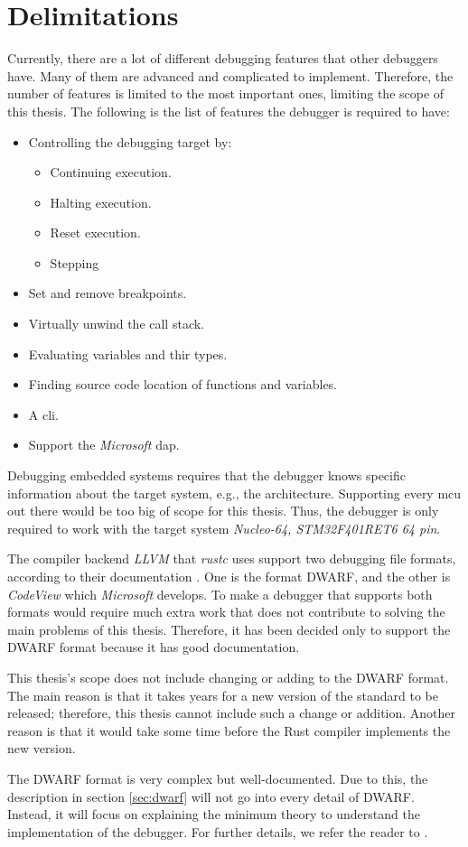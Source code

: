\section{Delimitations}
\label{sec:delimitations}
Currently, there are a lot of different debugging features that other debuggers have.
Many of them are advanced and complicated to implement.
Therefore, the number of features is limited to the most important ones, limiting the scope of this thesis.
The following is the list of features the debugger is required to have:


\begin{itemize} \label{list:debuggerfeatures}
  \item Controlling the debugging target by:
  \begin{itemize}
    \item Continuing execution.
    \item Halting execution.
    \item Reset execution.
    \item Stepping
  \end{itemize}
  \item Set and remove breakpoints.
  \item Virtually unwind the call stack.
  \item Evaluating variables and thir types.
  \item Finding source code location of functions and variables.
  \item A \acrfull{cli}.
  \item Support the \emph{Microsoft} \acrfull{dap}.
\end{itemize}


Debugging embedded systems requires that the debugger knows specific information about the target system, e.g., the architecture.
Supporting every \gls{mcu} out there would be too big of scope for this thesis.
Thus, the debugger is only required to work with the target system \emph{Nucleo-64, STM32F401RET6 64 pin}.


The compiler backend \emph{LLVM} that \emph{rustc} uses support two debugging file formats, according to their documentation \cite{llvm-dbs}.
One is the format \gls{DWARF}, and the other is \emph{CodeView} which \emph{Microsoft} develops.
To make a debugger that supports both formats would require much extra work that does not contribute to solving the main problems of this thesis.
Therefore, it has been decided only to support the \gls{DWARF} format because it has good documentation.


This thesis's scope does not include changing or adding to the \gls{DWARF} format.
The main reason is that it takes years for a new version of the standard to be released; therefore, this thesis cannot include such a change or addition.
Another reason is that it would take some time before the Rust compiler implements the new version.


The \gls{DWARF} format is very complex but well-documented.
Due to this, the description in section \ref{sec:dwarf} will not go into every detail of \gls{DWARF}.
Instead, it will focus on explaining the minimum theory to understand the implementation of the debugger.
For further details, we refer the reader to \cite{dwarf}.

